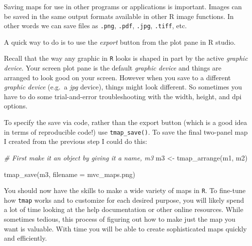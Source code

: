 \documentclass[
]{book}
\newenvironment{Shaded}{\begin{snugshade}}{\end{snugshade}}
\newcommand{\AttributeTok}[1]{\textcolor[rgb]{0.77,0.63,0.00}{#1}}
\newcommand{\CommentTok}[1]{\textcolor[rgb]{0.56,0.35,0.01}{\textit{#1}}}
\newcommand{\FunctionTok}[1]{\textcolor[rgb]{0.00,0.00,0.00}{#1}}
\newcommand{\NormalTok}[1]{#1}
\newcommand{\OtherTok}[1]{\textcolor[rgb]{0.56,0.35,0.01}{#1}}
\newcommand{\StringTok}[1]{\textcolor[rgb]{0.31,0.60,0.02}{#1}}
\begin{document}
Saving maps for use in other programs or applications is important. Images can be saved in the same output formats available in other R image functions. In other words we can save files as \texttt{.png}, \texttt{.pdf}, \texttt{.jpg}, \texttt{.tiff}, etc.

A quick way to do is to use the \emph{export} button from the plot pane in R studio.

Recall that the way any graphic in \texttt{R} looks is shaped in part by the active \emph{graphic device}. Your screen plot pane is the default \emph{graphic device} and things are arranged to look good on your screen. However when you save to a different \emph{graphic device} (e.g.~a \emph{jpg} device), things might look different. So sometimes you have to do some trial-and-error troubleshooting with the width, height, and dpi options.

To specify the save via code, rather than the export button (which is a good idea in terms of reproducible code!) use \texttt{tmap\_save()}. To save the final two-panel map I created from the previous step I could do this:

\begin{Shaded}
\begin{Highlighting}[]
\CommentTok{\# First make it an object by giving it a name, m3}
\NormalTok{m3 }\OtherTok{\textless{}{-}} \FunctionTok{tmap\_arrange}\NormalTok{(m1, m2)}

\FunctionTok{tmap\_save}\NormalTok{(m3, }\AttributeTok{filename =} \StringTok{\textquotesingle{}mvc\_maps.png\textquotesingle{}}\NormalTok{)}
\end{Highlighting}
\end{Shaded}

You should now have the skills to make a wide variety of maps in \texttt{R}. To fine-tune how \texttt{tmap} works and to customize for each desired purpose, you will likely spend a lot of time looking at the help documentation or other online resources. While sometimes tedious, this process of figuring out how to make just the map you want is valuable. With time you will be able to create sophisticated maps quickly and efficiently.

  
\end{document}

